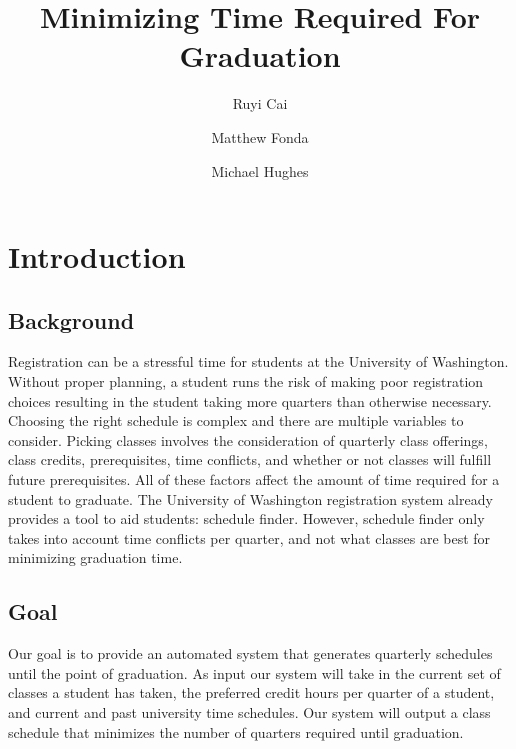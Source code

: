 \documentclass[11pt]{article} %
\title{Minimizing Time Required For Graduation}
\author{Ruyi Cai \and Matthew Fonda \and Michael Hughes}
\begin{document}
\maketitle

\pagebreak


\section{Introduction} \subsection{Background} Registration can be a stressful 
time for students at the University of Washington. Without proper planning, 
a student runs the risk of making poor registration choices resulting
in the student taking more quarters than otherwise necessary.
Choosing the right schedule is complex and there are multiple variables to
consider. Picking classes involves the consideration of quarterly class 
offerings, class credits, prerequisites, time conflicts, and whether or not 
classes will fulfill future prerequisites. All of these factors affect the amount
of time required for a student to graduate. The University of Washington registration
system already provides a tool to aid students: schedule finder. However, schedule
finder only takes into account time conflicts per quarter, and not what classes are
best for minimizing graduation time.

\subsection{Goal} Our goal is to provide an automated system that generates quarterly
schedules until the point of graduation. As input our system will take in
the current set of classes a student has taken, the preferred credit hours
per quarter of a student, and current and past university time schedules.
Our system will output a class schedule that minimizes the
number of quarters required until graduation.
\end{document}
